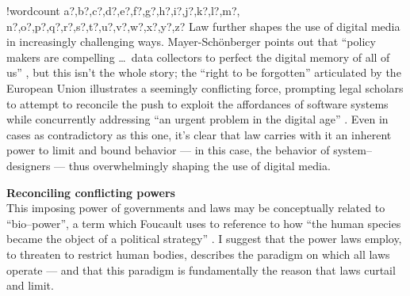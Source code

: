 \documentclass[11pt]{article}
\newcounter{words}
\newenvironment{counted}{%
  \setcounter{words}{0}
  \SearchList!{wordcount}{\stepcounter{words}}
    {a?,b?,c?,d?,e?,f?,g?,h?,i?,j?,k?,l?,m?,
    n?,o?,p?,q?,r?,s?,t?,u?,v?,w?,x?,y?,z?}
  \UndoBoundary{'}
  \SearchOrder{p;}}{%
  \StopSearching}
\newcommand{\sectitle}[1]{\textbf{#1}\\}
\begin{document}
\begin{counted}
Law further shapes the use of digital media in increasingly challenging ways.
Mayer-Sch{\"o}nberger points out that ``policy makers are compelling \ldots\ data collectors to perfect the digital memory of all of us''
\cite{mayer2011delete},
but this isn't the whole story;
the ``right to be forgotten'' articulated by the European Union illustrates a seemingly conflicting force,
prompting legal scholars to attempt to reconcile the push to exploit the affordances of software systems 
while concurrently addressing ``an urgent problem in the digital age''
\cite{rosen2012right}.
Even in cases as contradictory as this one,
it's clear that law carries with it an inherent power to limit and bound behavior
--- in this case, the behavior of system--designers ---
thus overwhelmingly shaping the use of digital media.
















\sectitle{Reconciling conflicting powers} %
This imposing power of governments and laws may be conceptually related to ``bio--power'', a term which Foucault uses to reference to how ``the human species became the object of a political strategy''
\cite{foucault2009security}.
I suggest that the power laws employ, to threaten to restrict human bodies, describes the paradigm on which all laws operate
--- and that this paradigm is fundamentally the reason that laws curtail and limit.


\end{counted}
\end{document}
